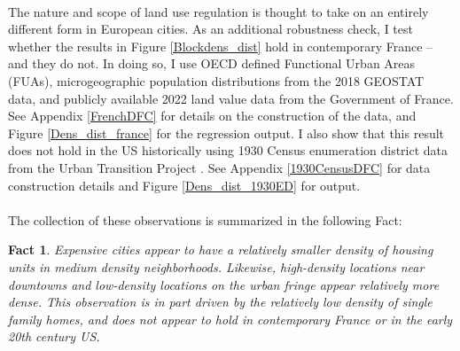 \documentclass[]{article}
\newtheorem{theorem}{Fact}
\begin{document}
\paragraph*{}
The nature and scope of land use regulation is thought to take on an entirely different form in European cities. As an additional robustness check, I test whether the results in Figure \ref{Blockdens_dist} hold in contemporary France -- and they do not. In doing so, I use OECD defined Functional Urban Areas (FUAs), microgeographic population distributions from the 2018 GEOSTAT data, and publicly available 2022 land value data from the Government of France. See Appendix \ref{FrenchDFC} for details on the construction of the data, and Figure \ref{Dens_dist_france} for the regression output. I also show that this result does not hold in the US historically using 1930 Census enumeration district data from the Urban Transition Project \citep{UrbTransitionProject}. See Appendix \ref{1930CensusDFC} for data construction details and Figure \ref{Dens_dist_1930ED} for output. 

\paragraph*{}
The collection of these observations is summarized in the following Fact:


\begin{theorem}\label{Fact1}
	Expensive cities appear to have a relatively smaller density of housing units in medium density neighborhoods. Likewise, high-density locations near downtowns and low-density locations on the urban fringe appear relatively more dense. This observation is in part driven by the relatively low density of single family homes, and does not appear to hold in contemporary France or in the early 20th century US. 
\end{theorem}
\end{document}
